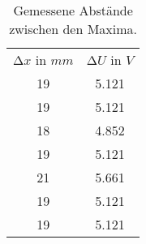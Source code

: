 \begin{table}
  \centering
  \caption{Gemessene Abstände zwischen den Maxima.}
  \label{tab:AbstaendeMaxima}
  \begin{tabular}{c c}
    \toprule
    $\increment x$ in $\si{mm}$ & $\increment U$ in $\si{V}$ \\
    19 & 5.121 \\
    19 & 5.121 \\
    18 & 4.852 \\
    19 & 5.121 \\
    21 & 5.661 \\
    19 & 5.121 \\
    19 & 5.121 \\
  \end{tabular}
\end{table}
